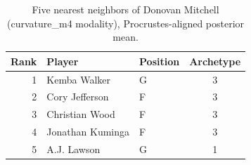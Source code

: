 \begin{table}[htbp]
  \centering\small
  \begin{tabular}{rllc}
    \toprule
    Rank & Player & Position & Archetype \\
    \midrule
    1 & Kemba Walker & G & 3 \\
    2 & Cory Jefferson & F & 3 \\
    3 & Christian Wood & F & 3 \\
    4 & Jonathan Kuminga & F & 3 \\
    5 & A.J. Lawson & G & 1 \\
    \bottomrule
  \end{tabular}
  \caption{Five nearest neighbors of Donovan Mitchell (curvature_m4 modality), Procrustes-aligned posterior mean.}
  \label{tab:Donovan_Mitchell_neighbors_curvature_m4}
\end{table}

